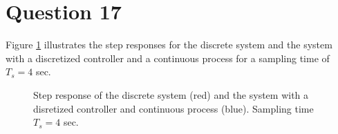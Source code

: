 \section{Question 17}

Figure \ref{fig:Q17.response} illustrates the step responses for the discrete
system and the system with a discretized controller and a continuous process
for a sampling time of $T_s = 4$ sec.

\begin{figure}[H]\centering
	\centering
	\scalebox{1}{}
  \caption{Step response of the discrete system (red) and the system with a
    disretized controller and continuous process (blue). Sampling time $T_s=4$ sec.}
  \label{fig:Q17.response}
\end{figure}
